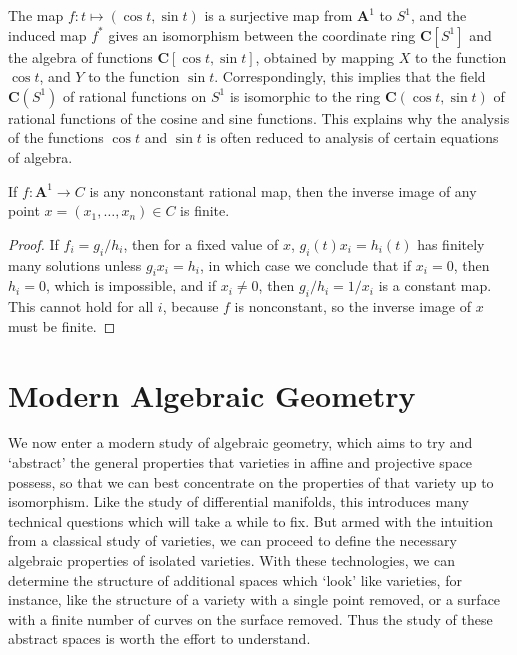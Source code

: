 \begin{example}
    The map $f: t \mapsto (\cos t, \sin t)$ is a surjective map from $\mathbf{A}^1$ to $S^1$, and the induced map $f^*$ gives an isomorphism between the coordinate ring $\mathbf{C}[S^1]$ and the algebra of functions $\mathbf{C}[\cos t, \sin t]$, obtained by mapping $X$ to the function $\cos t$, and $Y$ to the function $\sin t$. Correspondingly, this implies that the field $\mathbf{C}(S^1)$ of rational functions on $S^1$ is isomorphic to the ring $\mathbf{C}(\cos t, \sin t)$ of rational functions of the cosine and sine functions. This explains why the analysis of the functions $\cos t$ and $\sin t$ is often reduced to analysis of certain equations of algebra.
\end{example}

\begin{theorem}
    If $f: \mathbf{A}^1 \to C$ is any nonconstant rational map, then the inverse image of any point $x = (x_1, \dots, x_n) \in C$ is finite.
\end{theorem}
\begin{proof}
    If $f_i = g_i/h_i$, then for a fixed value of $x$, $g_i(t)x_i = h_i(t)$ has finitely many solutions unless $g_ix_i = h_i$, in which case we conclude that if $x_i = 0$, then $h_i = 0$, which is impossible, and if $x_i \neq 0$, then $g_i/h_i = 1/x_i$ is a constant map. This cannot hold for all $i$, because $f$ is nonconstant, so the inverse image of $x$ must be finite.
\end{proof}

\part{Modern Algebraic Geometry}

We now enter a modern study of algebraic geometry, which aims to try and `abstract' the general properties that varieties in affine and projective space possess, so that we can best concentrate on the properties of that variety up to isomorphism. Like the study of differential manifolds, this introduces many technical questions which will take a while to fix. But armed with the intuition from a classical study of varieties, we can proceed to define the necessary algebraic properties of isolated varieties. With these technologies, we can determine the structure of additional spaces which `look' like varieties, for instance, like the structure of a variety with a single point removed, or a surface with a finite number of curves on the surface removed. Thus the study of these abstract spaces is worth the effort to understand.

